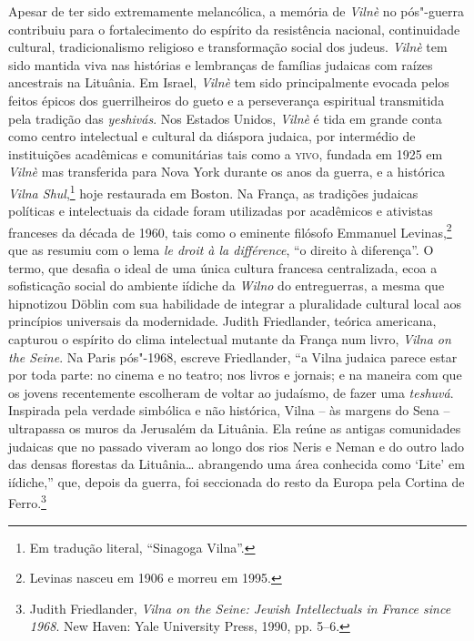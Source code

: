 Apesar de ter sido extremamente melancólica, a memória de \textit{Vilnè} no
pós"-guerra contribuiu para o fortalecimento do espírito da resistência
nacional, continuidade cultural, tradicionalismo religioso e
transformação social dos judeus. \textit{Vilnè} tem sido mantida viva nas
histórias e lembranças de famílias judaicas com raízes ancestrais na
Lituânia. Em Israel, \textit{Vilnè} tem sido principalmente evocada pelos feitos
épicos dos guerrilheiros do gueto e a perseverança espiritual
transmitida pela tradição das \textit{yeshivás}. Nos Estados Unidos, \textit{Vilnè} é tida
em grande conta como centro intelectual e cultural da diáspora judaica,
por intermédio de instituições acadêmicas e comunitárias tais como a
\textsc{yivo}, fundada em 1925 em \textit{Vilnè} mas transferida para Nova York durante os
anos da guerra, e a histórica \textit{Vilna Shul},\footnote{Em tradução literal, ``Sinagoga Vilna''.} hoje restaurada em Boston. 
Na França, as tradições judaicas políticas e
intelectuais da cidade foram utilizadas por acadêmicos e ativistas
franceses da década de 1960, tais como o eminente filósofo Emmanuel
Levinas,\footnote{Levinas nasceu em 1906 e morreu em 1995.} que as resumiu com o lema \textit{le droit à la
différence}, ``o direito à diferença''. O termo, que desafia o ideal de
uma única cultura francesa centralizada, ecoa a sofisticação social do
ambiente iídiche da \textit{Wilno} do entreguerras, a mesma que hipnotizou
Döblin com sua habilidade de integrar a pluralidade cultural local aos
princípios universais da modernidade. Judith Friedlander, teórica
americana, capturou o espírito do clima intelectual mutante da França
num livro, \textit{Vilna on the Seine}. Na Paris pós"-1968, escreve
Friedlander, ``a Vilna judaica parece estar por toda parte: no cinema e
no teatro; nos livros e jornais; e na maneira com que os jovens
recentemente escolheram de voltar ao judaísmo, de fazer uma \textit{teshuvá}.
Inspirada pela verdade simbólica e não histórica, Vilna -- às margens do
Sena -- ultrapassa os muros da Jerusalém da Lituânia. Ela reúne as antigas
comunidades judaicas que no passado viveram ao longo dos rios Neris e
Neman e do outro lado das densas florestas da Lituânia\ldots{}
abrangendo uma área conhecida como `Lite' em iídiche,'' que, depois da
guerra, foi seccionada do resto da Europa pela Cortina de
Ferro.\footnote{Judith Friedlander, \textit{Vilna on the Seine: Jewish Intellectuals in France since 1968}. New Haven: Yale University Press, 1990, pp. 5--6.}

